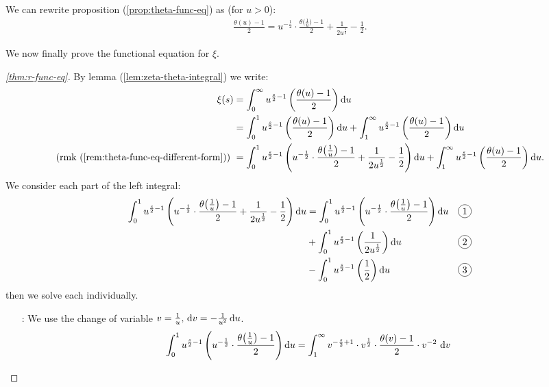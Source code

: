 \begin{remark}\label{rem:theta-func-eq-different-form}
We can rewrite proposition (\ref{prop:theta-func-eq}) as (for $u>0$):
\begin{align*}
    \frac{\theta(u) - 1}{2} = u^{- \frac{1}{2}} \cdot \frac{\theta\big(\tfrac{1}{u}\big) - 1}{2} + \frac{1}{2 u^{\frac{1}{2}}} - \frac{1}{2}.
\end{align*}
\end{remark}

We now finally prove the functional equation for $\xi$.\\

\begin{proof}[\ref{thm:r-func-eq}]
By lemma (\ref{lem:zeta-theta-integral}) we write:
\begin{align*}
    \xi(s) &= \int_0^\infty u^{\frac{s}{2} - 1} \br{\frac{\theta(u) - 1}{2}} \dif u\\
    &= \int_0^1 u^{\frac{s}{2} - 1} \br{\frac{\theta(u) - 1}{2}} \dif u + \int_1^\infty u^{\frac{s}{2} - 1} \br{\frac{\theta(u) - 1}{2}} \dif u\\
    \text{(rmk (\ref{rem:theta-func-eq-different-form})) } &= \int_0^1 u^{\frac{s}{2} - 1} \br{u^{- \frac{1}{2}} \cdot \frac{\theta\big(\tfrac{1}{u}\big) - 1}{2} + \frac{1}{2 u^{\frac{1}{2}}} - \frac{1}{2}} \dif u + \int_1^\infty u^{\frac{s}{2} - 1} \br{\frac{\theta(u) - 1}{2}} \dif u.
\end{align*}
We consider each part of the left integral:
\begin{align*}
    \int_0^1 u^{\frac{s}{2} - 1} \br{u^{- \frac{1}{2}} \cdot \frac{\theta\big(\tfrac{1}{u}\big) - 1}{2} + \frac{1}{2 u^{\frac{1}{2}}} - \frac{1}{2}} \dif u &= \int_0^1 u^{\frac{s}{2} - 1} \br{u^{- \frac{1}{2}} \cdot \frac{\theta\big(\tfrac{1}{u}\big) - 1}{2}} \dif u && \circled{1} \\& + \int_0^1 u^{\frac{s}{2} - 1} \br{\frac{1}{2 u^{\frac{1}{2}}}} \dif u && \circled{2} \\& - \int_0^1 u^{\frac{s}{2} - 1} \br{\frac{1}{2}} \dif u && \circled{3}
\end{align*}
then we solve each individually.
\begin{enumerate}
    \item[\circled{1} :] We use the change of variable $v = \frac{1}{u}, \, \dif v = - \frac{1}{u^2} \dif u$.
    \begin{align*}
        \int_0^1 u^{\frac{s}{2} - 1} \br{u^{- \frac{1}{2}} \cdot \frac{\theta\big(\tfrac{1}{u}\big) - 1}{2}} \dif u &= \int_1^\infty v^{-\frac{s}{2} + 1} \cdot v^{ \frac{1}{2}} \cdot \frac{\theta (v ) - 1}{2} \cdot v^{-2} \, \dif v\\

\end{align*}
\end{enumerate}
\end{proof}
